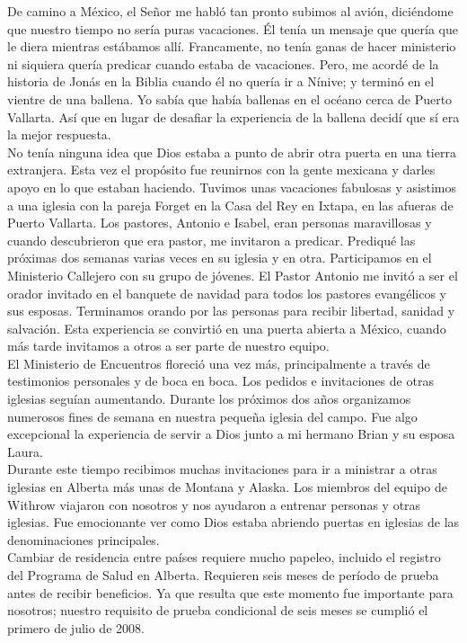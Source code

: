 \documentclass[twoside, 12pt]{book}
\begin{document}
De camino a México, el Señor me habló tan pronto subimos al avión, diciéndome que nuestro tiempo no sería puras vacaciones. Él tenía un mensaje que quería que le diera mientras estábamos allí. Francamente, no tenía ganas de hacer ministerio ni siquiera quería predicar cuando estaba de vacaciones. Pero, me acordé de la historia de Jonás en la Biblia cuando él no quería ir a Nínive; y terminó en el vientre de una ballena. Yo sabía que había ballenas en el océano cerca de Puerto Vallarta. Así que en lugar de desafiar la experiencia de la ballena decidí que sí era la mejor respuesta.\\

No tenía ninguna idea que Dios estaba a punto de abrir otra puerta en una tierra extranjera. Esta vez el propósito fue reunirnos con la gente mexicana y darles apoyo en lo que estaban haciendo. Tuvimos unas vacaciones fabulosas y asistimos a una iglesia con la pareja Forget en la Casa del Rey en Ixtapa, en las afueras de Puerto Vallarta. Los pastores, Antonio e Isabel, eran personas maravillosas y cuando descubrieron que era pastor, me invitaron a predicar. Prediqué las próximas dos semanas varias veces en su iglesia y en otra. Participamos en el Ministerio Callejero con su grupo de jóvenes.  El Pastor Antonio me invitó a ser el orador invitado en el banquete de navidad para todos los pastores evangélicos y sus esposas. Terminamos orando por las personas para recibir libertad, sanidad y salvación. Esta experiencia se convirtió en una puerta abierta a México, cuando más tarde invitamos a otros a ser parte de nuestro equipo.\\

El Ministerio de Encuentros floreció una vez más, principalmente a través de testimonios personales y de boca en boca. Los pedidos e invitaciones de otras iglesias seguían aumentando. Durante los próximos dos años organizamos numerosos fines de semana en nuestra pequeña iglesia del campo. Fue algo excepcional la experiencia de servir a Dios junto a mi hermano Brian y su esposa Laura.\\

Durante este tiempo recibimos muchas invitaciones para ir a ministrar a otras iglesias en Alberta más unas de Montana y Alaska. Los miembros del equipo de Withrow viajaron con nosotros y nos ayudaron a entrenar personas y otras iglesias. Fue emocionante ver como Dios estaba abriendo puertas en iglesias de las denominaciones principales.\\

Cambiar de residencia entre países requiere mucho papeleo, incluido el registro del Programa de Salud en Alberta. Requieren seis meses de período de prueba antes de recibir beneficios. Ya que resulta que este momento fue importante para nosotros; nuestro requisito de prueba condicional de seis meses se cumplió el primero de julio de 2008.\\
\end{document}
